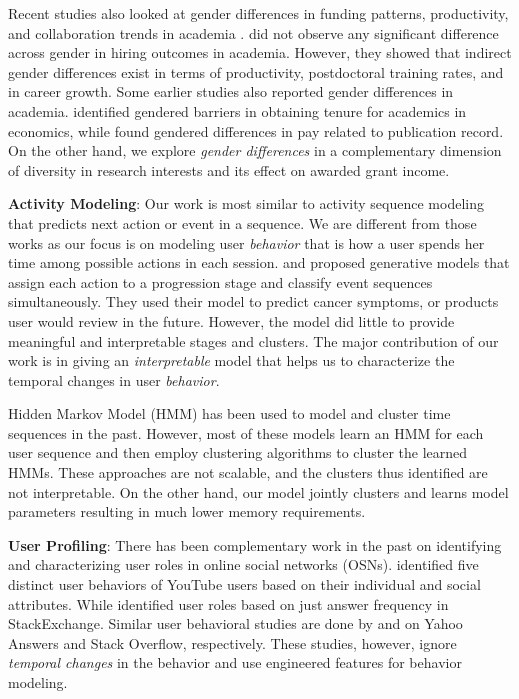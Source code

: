 \documentclass[10pt,letterpaper]{article}
\begin{document}
Recent studies also looked at gender differences in funding patterns, productivity, and collaboration trends in academia \cite{Way:2016, Way:2017}. \cite{Way:2016} did not observe any significant difference across gender in hiring outcomes in academia. However, they showed that indirect gender differences exist in terms of productivity, postdoctoral training rates, and in career growth. Some earlier studies also reported gender differences in academia. \cite{Kahn:1993} identified gendered barriers in obtaining tenure for academics in economics, while \cite{Ward:2001} found gendered differences in pay related to publication record. On the other hand, we explore \emph{gender differences} in a complementary dimension of diversity in research interests and its effect on awarded grant income.

\textbf{Activity Modeling}: Our work is most similar to activity sequence modeling that predicts next action or event in a sequence. We are different from those works as our focus is on modeling user \emph{behavior} that is how a user spends her time among possible actions in each session. \cite{Yang:2014} and \cite{Knab2003} proposed generative models that assign each action to a progression stage and classify event sequences simultaneously. They used their model to predict cancer symptoms, or products user would review in the future. However, the model did little to provide meaningful and interpretable stages and clusters. The major contribution of our work is in giving an \emph{interpretable} model that helps us to characterize the temporal changes in user \emph{behavior}.

Hidden Markov Model (HMM) has been used to model and cluster time sequences \cite{Smyth:1997, Bicego:2003, Coviello:2014} in the past. However, most of these models learn an HMM for each user sequence and then employ clustering algorithms to cluster the learned HMMs. These approaches are not scalable, and the clusters thus identified are not interpretable. On the other hand, our model jointly clusters and learns model parameters resulting in much lower memory requirements.

\textbf{User Profiling}: There has been complementary work in the past on identifying and characterizing user roles in online social networks (OSNs). \cite{Maia:2008} identified five distinct user behaviors of YouTube users based on their individual and social attributes. While \cite{Mamykina:2011} identified user roles based on just answer frequency in StackExchange. Similar user behavioral studies are done by \cite{Adamic:2008} and \cite{Furtado:2013} on Yahoo Answers and Stack Overflow, respectively. These studies, however, ignore \emph{temporal changes} in the behavior and use engineered features for behavior modeling.
\end{document}
